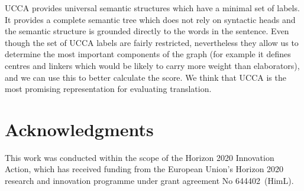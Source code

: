 \documentclass[11pt,letterpaper]{article}
\newcommand{\GrantNo}{644402}
\newcommand{\ProjectName}{HimL}
\newcommand{\ProjectType}{Horizon 2020 Innovation Action}
\begin{document}
{UCCA provides universal semantic structures which 
have
a minimal set of labels. It provides a complete semantic tree which does not rely on syntactic heads and the semantic structure is grounded directly to the words in the sentence. 
 Even though the set of UCCA labels are fairly restricted,  nevertheless they allow us to determine the most important components of the graph (for example it defines centres and linkers which would be likely to carry more weight than elaborators), and we can use this to better calculate the score. 
We think that UCCA is the
most promising representation for evaluating translation. 
}

\section*{Acknowledgments}
{T}his work was conducted within the scope of the \ProjectType, which has received funding from the European Union's Horizon 2020 research and innovation programme under grant agreement No \GrantNo\ (\ProjectName).




\end{document}
